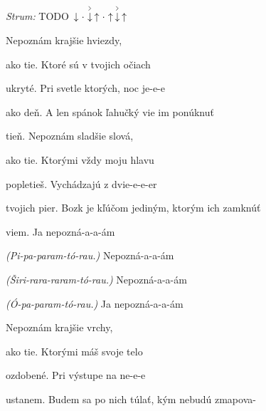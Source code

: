 \begin{song}


\begin{headerbox}
\RaiseBoxWithAccents
{} \quad
\textit{Strum:} TODO $\Down\Miss\AccentDown\Up\Miss\Up\AccentDown\Up$
\end{headerbox}

\begin{hchordbox}
\end{hchordbox}

\large

\bigskip

 Nepoznám krajšie hviezdy,  \par
ako tie. Ktoré sú v tvojich očiach  \par
ukryté. Pri svetle ktorých, noc je-e-e  \par
ako deň. A len spánok ľahučký vie im ponúknuť \par

\bigskip

tieň. Nepoznám sladšie slová,  \par
ako tie. Ktorými vždy moju hlavu  \par
popletieš. Vychádzajú z dvie-e-e-er  \par
tvojich pier. Bozk je kľúčom jediným, ktorým ich zamknúť \par

\bigskip

\begin{chorusbox}{\Refren}
viem. Ja nepozná-a-a-ám \par
\textit{(Pi-pa-param-}\textit{tó-rau.)} Nepozná-a-a-ám \par
\textit{(Širi-rara-raram-}\textit{tó-rau.)} Nepozná-a-a-ám \par
\textit{(Ó-pa-param-}\textit{tó-rau.)} Ja nepozná-a-a-ám \par
\end{chorusbox}

\bigskip

 Nepoznám krajšie vrchy, \par
ako tie. Ktorými máš svoje telo  \par
ozdobené. Pri výstupe na ne-e-e  \par
ustanem. Budem sa po nich túlať, kým nebudú zmapova- \par


\end{song}
